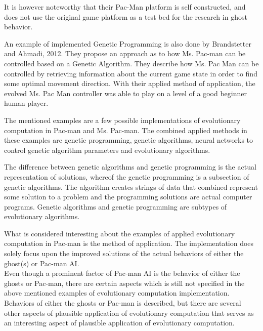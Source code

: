 It is however noteworthy that their Pac-Man platform is self constructed, and does not use the original game platform as a test bed for the research in ghost behavior.

An example of implemented Genetic Programming is also done by Brandstetter and Ahmadi, 2012. They propose an approach as to how Ms. Pac-man can be controlled based on a Genetic Algorithm.
They describe how Ms. Pac Man can be controlled by retrieving information about the current game state in order to find some optimal movement direction.
With their applied method of application, the evolved Ms. Pac Man controller was able to play on a level of a good beginner human player. \cite{Brandstetter2012}

The mentioned examples are a few possible implementations of evolutionary computation in Pac-man and Ms. Pac-man. The combined applied methods in these examples are genetic programming, genetic algorithms, neural networks to control genetic algorithm parameters and evolutionary algorithms.

The difference between genetic algorithms and genetic programming is the actual representation of solutions, whereof the genetic programming is a subsection of genetic algorithms. The algorithm creates strings of data that combined represent some solution to a problem and the programming solutions are actual computer programs.\cite{genetic}
Genetic algorithms and genetic programming are subtypes of evolutionary algorithms.

What is considered interesting about the examples of applied evolutionary computation in Pac-man is the method of application. The implementation does solely focus upon the improved solutions of the actual behaviors of either the ghost(s) or Pac-man AI.\\
Even though a prominent factor of Pac-man AI is the behavior of either the ghosts or Pac-man, there are certain aspects which is still not specified in the above mentioned examples of evolutionary computation implementation. Behaviors of either the ghosts or Pac-man is described, but there are several other aspects of plausible application of evolutionary computation that serves as an interesting aspect of plausible application of evolutionary computation.\\